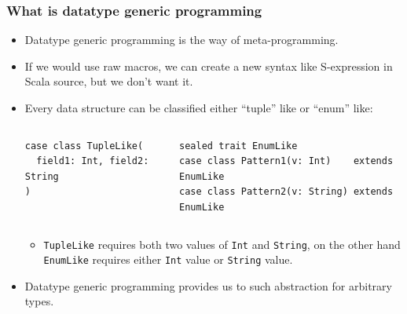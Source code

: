 \begin{frame}[fragile]
  \frametitle{What is datatype generic programming}

  \begin{itemize}
    \item Datatype generic programming is the way of meta-programming.

    \item If we would use raw macros, we can create a new syntax like S-expression in Scala source,
    but we don't want it.

    \item Every data structure can be classified either ``tuple'' like or ``enum'' like:
    \begin{columns}
      \begin{column}{0.4\textwidth}
\begin{lstlisting}[style=scala, caption=tuple like]
case class TupleLike(
  field1: Int, field2: String
)
\end{lstlisting}
      \end{column}
      \begin{column}{0.6\textwidth}
\begin{lstlisting}[style=scala, caption=enum like]
sealed trait EnumLike
case class Pattern1(v: Int)    extends EnumLike
case class Pattern2(v: String) extends EnumLike
\end{lstlisting}
      \end{column}
    \end{columns}
    \begin{itemize}
      \item \lstinline|TupleLike| requires both two values of \lstinline|Int| and \lstinline|String|,
      on the other hand \lstinline|EnumLike| requires either \lstinline|Int| value or \lstinline|String| value.
    \end{itemize}

    \item Datatype generic programming provides us to such abstraction
    for arbitrary types.
  \end{itemize}

\end{frame}


